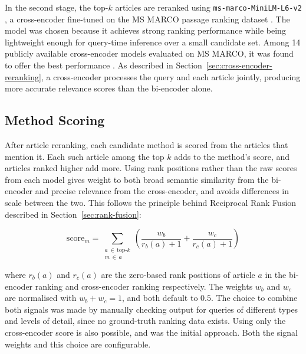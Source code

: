 In the second stage, the top-$k$ articles are reranked using 
\texttt{ms-marco-MiniLM-L6-v2} \parencite{sbert_crossencoder_msmarco}, a 
cross-encoder fine-tuned on the MS MARCO passage ranking dataset \parencite{bajaj2018ms_marco_machine_reading_comprehension_dataset}.
The model was chosen because it achieves strong 
ranking performance while being lightweight enough for query-time 
inference over a small candidate set. Among 14 publicly 
available cross-encoder models evaluated on MS MARCO, 
it was found to offer the best performance 
\parencite{thakur2021beir_heterogenous_benchmark_zero_shot_evaluation_ir_models}. 
As described in Section~\ref{sec:cross-encoder-reranking}, a cross-encoder 
processes the query and each article jointly, producing more 
accurate relevance scores than the bi-encoder alone.

\subsection{Method Scoring}
\label{sec:method-scoring}

After article reranking, each candidate method is scored from the 
articles that mention it. Each such article among the top $k$ adds 
to the method's score, and articles ranked higher add more. Using 
rank positions rather than the raw scores from each model gives 
weight to both broad semantic similarity from the bi-encoder and 
precise relevance from the cross-encoder, and avoids differences 
in scale between the two. This follows the principle behind 
Reciprocal Rank Fusion described in 
Section~\ref{sec:rank-fusion}:

\begin{equation}
    \text{score}_m = \sum_{\substack{a \,\in\, \text{top-}k \\ 
    m \,\in\, a}}
        \left(
            \frac{w_b}{r_b(a) + 1} + \frac{w_c}{r_c(a) + 1}
        \right)
\label{eq:method-score}
\end{equation}

where $r_b(a)$ and $r_c(a)$ are the zero-based rank positions of 
article $a$ in the bi-encoder ranking and cross-encoder ranking 
respectively. The weights $w_b$ and $w_c$ are normalised with 
$w_b + w_c = 1$, and both default to $0.5$. The choice to combine 
both signals was made by manually checking output for queries of 
different types and levels of detail, since no ground-truth 
ranking data exists. Using only the cross-encoder score is also 
possible, and was the initial approach. Both the signal weights 
and this choice are configurable.

